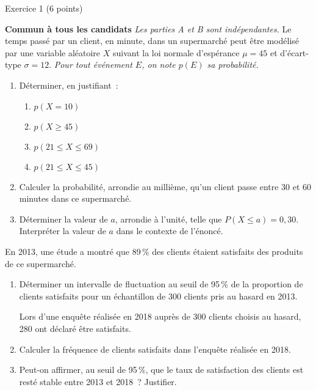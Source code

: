 
%
\begin{h2}Exercice 1 (6 points)\end{h2}
\textbf{Commun à  tous les candidats}
\medbreak
\emph{Les parties \emph{A} et \emph{B} sont indépendantes.}
Le temps passé par un client, en minute, dans un supermarché peut être modélisé par une variable aléatoire $X$ suivant la loi normale d'espérance $\mu=45$ et d'écart-type $\sigma=12$.
\smallbreak
\emph{Pour tout événement $E$, on note $p(E)$ sa probabilité.}
\begin{enumerate}
     \item Déterminer, en justifiant~:
     \begin{enumerate}[label=\alph*.]
          \item $p(X=10)$
          \item $p(X\geqslant 45)$
          \item $p(21 \leqslant X \leqslant 69)$
          \item $p(21 \leqslant X \leqslant 45)$
     \end{enumerate}
     \item Calculer la probabilité, arrondie au millième, qu'un client passe entre 30 et 60 minutes dans ce supermarché.
     \item Déterminer la valeur de $a$, arrondie à l'unité, telle que $P(X\leqslant a)=0,30$. Interpréter la valeur de $a$ dans le contexte de l'énoncé.
\end{enumerate}
En 2013, une étude a montré que 89\,\% des clients étaient satisfaits des produits de ce supermarché.
\begin{enumerate}
     \item Déterminer un intervalle de fluctuation au seuil de 95\,\% de la proportion de clients satisfaits pour un échantillon de 300 clients pris au hasard en 2013.
     \begin{margeneg}
          Lors d'une enquête réalisée en 2018 auprès de 300 clients choisis au hasard, 280 ont déclaré être satisfaits.
     \end{margeneg}
     \item Calculer la fréquence de clients satisfaits dans l'enquête réalisée en 2018.
     \item Peut-on affirmer, au seuil de 95\,\%, que le taux de satisfaction des clients est resté stable entre 2013 et 2018~? Justifier.
\end{enumerate}
